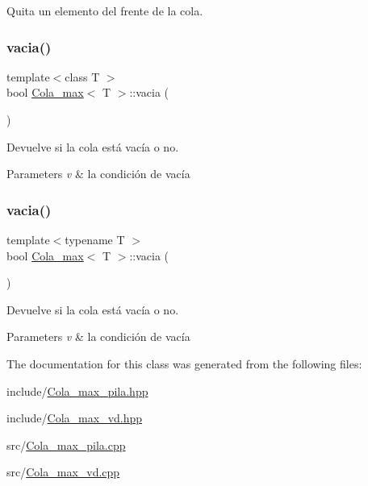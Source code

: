 Quita un elemento del frente de la cola. 

\mbox{\label{class_cola__max_af0b18f86af91ef94d7a035f87a4dcb2b}} 
\subsubsection{\texorpdfstring{vacia()}{vacia()}\hspace{0.1cm}{\footnotesize\ttfamily [1/2]}}
{\footnotesize\ttfamily template$<$class T $>$ \\
bool \mbox{\hyperlink{class_cola__max}{Cola\+\_\+max}}$<$ T $>$\+::vacia (\begin{DoxyParamCaption}{ }\end{DoxyParamCaption})}



Devuelve si la cola está vacía o no. 


\begin{DoxyParams}{Parameters}
{\em v} & la condición de vacía \\
\hline
\end{DoxyParams}
\mbox{\label{class_cola__max_af0b18f86af91ef94d7a035f87a4dcb2b}} 
\subsubsection{\texorpdfstring{vacia()}{vacia()}\hspace{0.1cm}{\footnotesize\ttfamily [2/2]}}
{\footnotesize\ttfamily template$<$typename T $>$ \\
bool \mbox{\hyperlink{class_cola__max}{Cola\+\_\+max}}$<$ T $>$\+::vacia (\begin{DoxyParamCaption}{ }\end{DoxyParamCaption})}



Devuelve si la cola está vacía o no. 


\begin{DoxyParams}{Parameters}
{\em v} & la condición de vacía \\
\hline
\end{DoxyParams}


The documentation for this class was generated from the following files\+:\begin{DoxyCompactItemize}
\item 
include/\mbox{\hyperlink{_cola__max__pila_8hpp}{Cola\+\_\+max\+\_\+pila.\+hpp}}\item 
include/\mbox{\hyperlink{_cola__max__vd_8hpp}{Cola\+\_\+max\+\_\+vd.\+hpp}}\item 
src/\mbox{\hyperlink{_cola__max__pila_8cpp}{Cola\+\_\+max\+\_\+pila.\+cpp}}\item 
src/\mbox{\hyperlink{_cola__max__vd_8cpp}{Cola\+\_\+max\+\_\+vd.\+cpp}}\end{DoxyCompactItemize}
